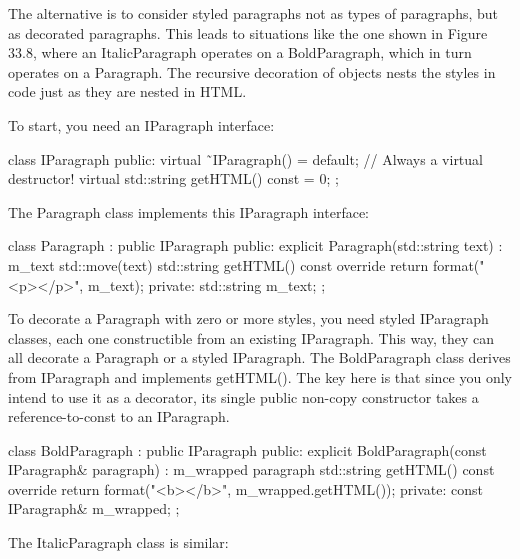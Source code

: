 
The alternative is to consider styled paragraphs not as types of paragraphs, but as decorated paragraphs. This leads to situations like the one shown in Figure 33.8, where an ItalicParagraph operates on a BoldParagraph, which in turn operates on a Paragraph. The recursive decoration of objects nests the styles in code just as they are nested in HTML.



To start, you need an IParagraph interface:

\begin{cpp}
class IParagraph
{
    public:
        virtual ˜IParagraph() = default; // Always a virtual destructor!
        virtual std::string getHTML() const = 0;
};
\end{cpp}

The Paragraph class implements this IParagraph interface:

\begin{cpp}
class Paragraph : public IParagraph
{
    public:
        explicit Paragraph(std::string text) : m_text { std::move(text) } {}
        std::string getHTML() const override {return format("<p>{}</p>", m_text); }
    private:
        std::string m_text;
};
\end{cpp}

To decorate a Paragraph with zero or more styles, you need styled IParagraph classes, each one constructible from an existing IParagraph. This way, they can all decorate a Paragraph or a styled IParagraph. The BoldParagraph class derives from IParagraph and implements getHTML(). The key here is that since you only intend to use it as a decorator, its single public non-copy constructor takes a reference-to-const to an IParagraph.

\begin{cpp}
class BoldParagraph : public IParagraph
{
    public:
        explicit BoldParagraph(const IParagraph& paragraph)
        : m_wrapped { paragraph } { }
        std::string getHTML() const override {
            return format("<b>{}</b>", m_wrapped.getHTML()); }
    private:
        const IParagraph& m_wrapped;
};
\end{cpp}

The ItalicParagraph class is similar:

